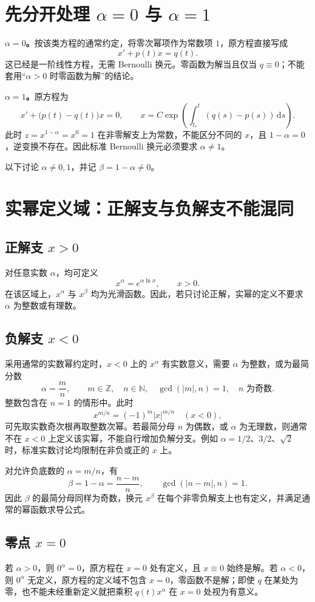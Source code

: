 \documentclass[11pt,a4paper]{ctexart}
\newcommand{\dd}{\,\mathrm d}
\begin{document}
\section{先分开处理 $\alpha=0$ 与 $\alpha=1$}
\textbf{$\alpha=0$。}按该类方程的通常约定，将零次幂项作为常数项 $1$，原方程直接写成
\[
x'+p(t)x=q(t).
\]
这已经是一阶线性方程，无需 Bernoulli 换元。零函数为解当且仅当 $q\equiv0$；不能套用“$\alpha>0$ 时零函数为解”的结论。

\textbf{$\alpha=1$。}原方程为
\[
x'+\bigl(p(t)-q(t)\bigr)x=0,
\qquad x=C\exp\!\left(\int_{t_*}^t(q(s)-p(s))\dd s\right).
\]
此时 $z=x^{1-\alpha}=x^0=1$ 在非零解支上为常数，不能区分不同的 $x$，且 $1-\alpha=0$，逆变换不存在。因此标准 Bernoulli 换元必须要求 $\alpha\ne1$。

以下讨论 $\alpha\ne0,1$，并记 $\beta=1-\alpha\ne0$。

\section{实幂定义域：正解支与负解支不能混同}
\subsection{正解支 $x>0$}
对任意实数 $\alpha$，均可定义
\[
x^\alpha=e^{\alpha\ln x},\qquad x>0.
\]
在该区域上，$x^\alpha$ 与 $x^\beta$ 均为光滑函数。因此，若只讨论正解，实幂的定义不要求 $\alpha$ 为整数或有理数。

\subsection{负解支 $x<0$}
采用通常的实数幂约定时，$x<0$ 上的 $x^\alpha$ 有实数意义，需要 $\alpha$ 为整数，或为最简分数
\[
\alpha=\frac mn,\qquad m\in\mathbb Z,\quad n\in\mathbb N,
\quad \gcd(|m|,n)=1,\quad n\text{ 为奇数}.
\]
整数包含在 $n=1$ 的情形中。此时
\[
x^{m/n}=(-1)^m|x|^{m/n}\quad(x<0),
\]
可先取实数奇次根再取整数次幂。若最简分母 $n$ 为偶数，或 $\alpha$ 为无理数，则通常不在 $x<0$ 上定义该实幂，不能自行增加负解分支。例如 $\alpha=1/2$、$3/2$、$\sqrt2$ 时，标准实数讨论均限制在非负或正的 $x$ 上。

对允许负底数的 $\alpha=m/n$，有
\[
\beta=1-\alpha=\frac{n-m}{n},\qquad
\gcd(|n-m|,n)=1.
\]
因此 $\beta$ 的最简分母同样为奇数，换元 $x^\beta$ 在每个非零负解支上也有定义，并满足通常的幂函数求导公式。

\subsection{零点 $x=0$}
若 $\alpha>0$，则 $0^\alpha=0$，原方程在 $x=0$ 处有定义，且 $x\equiv0$ 始终是解。若 $\alpha<0$，则 $0^\alpha$ 无定义，原方程的定义域不包含 $x=0$，零函数不是解；即使 $q$ 在某处为零，也不能未经重新定义就把乘积 $q(t)x^\alpha$ 在 $x=0$ 处视为有意义。
\end{document}
